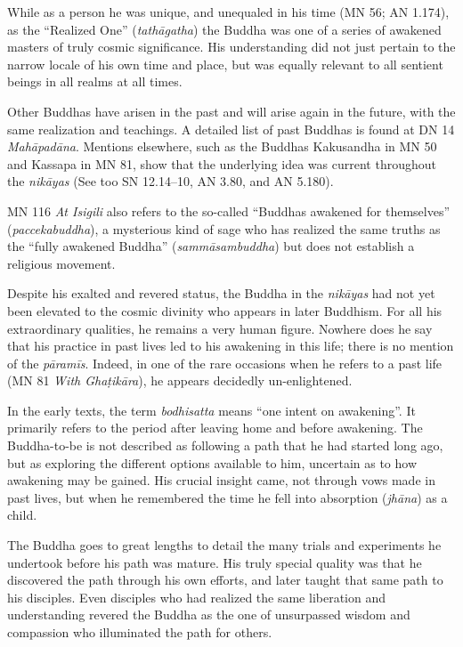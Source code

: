 \documentclass[12pt,openany]{book}%
\begin{document}
While as a person he was unique, and unequaled in his time (MN 56; AN 1.174), as the “Realized One” (\textit{\textsanskrit{tathāgatha}}) the Buddha was one of a series of awakened masters of truly cosmic significance. His understanding did not just pertain to the narrow locale of his own time and place, but was equally relevant to all sentient beings in all realms at all times.

Other Buddhas have arisen in the past and will arise again in the future, with the same realization and teachings. A detailed list of past Buddhas is found at DN 14 \textit{\textsanskrit{Mahāpadāna}}. Mentions elsewhere, such as the Buddhas Kakusandha in MN 50 and Kassapa in MN 81, show that the underlying idea was current throughout the \textit{\textsanskrit{nikāyas}} (See too SN 12.14–10, AN 3.80, and AN 5.180).

MN 116 \textit{At Isigili} also refers to the so-called “Buddhas awakened for themselves” (\textit{paccekabuddha}), a mysterious kind of sage who has realized the same truths as the “fully awakened Buddha” (\textit{\textsanskrit{sammāsambuddha}}) but does not establish a religious movement.

Despite his exalted and revered status, the Buddha in the \textit{\textsanskrit{nikāyas}} had not yet been elevated to the cosmic divinity who appears in later Buddhism. For all his extraordinary qualities, he remains a very human figure. Nowhere does he say that his practice in past lives led to his awakening in this life; there is no mention of the \textit{\textsanskrit{pāramīs}}. Indeed, in one of the rare occasions when he refers to a past life (MN 81 \textit{With \textsanskrit{Ghaṭikāra}}), he appears decidedly un-enlightened.

In the early texts, the term \textit{bodhisatta} means “one intent on awakening”. It primarily refers to the period after leaving home and before awakening. The Buddha-to-be is not described as following a path that he had started long ago, but as exploring the different options available to him, uncertain as to how awakening may be gained. His crucial insight came, not through vows made in past lives, but when he remembered the time he fell into absorption (\textit{\textsanskrit{jhāna}}) as a child.

The Buddha goes to great lengths to detail the many trials and experiments he undertook before his path was mature. His truly special quality was that he discovered the path through his own efforts, and later taught that same path to his disciples. Even disciples who had realized the same liberation and understanding revered the Buddha as the one of unsurpassed wisdom and compassion who illuminated the path for others.
\end{document}
